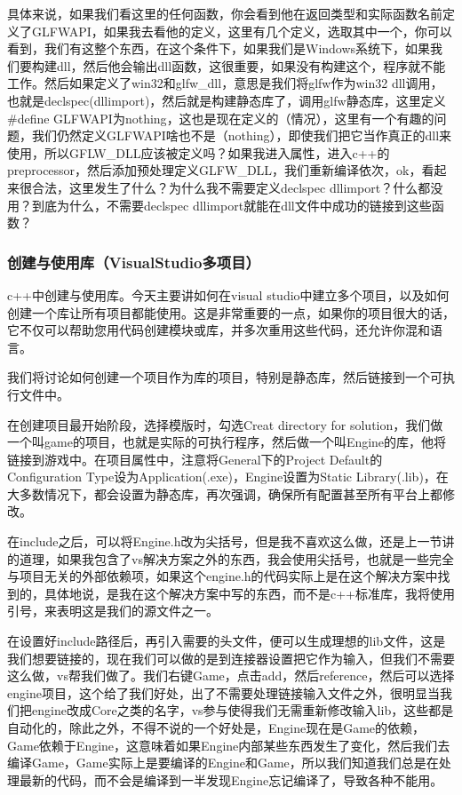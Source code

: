 具体来说，如果我们看这里的任何函数，你会看到他在返回类型和实际函数名前定义了{\ncodestyle GLFWAPI}，如果我去看他的定义，这里有几个定义，选取其中一个，你可以看到，我们有这整个东西，在这个条件下，如果我们是Windows系统下，如果我们要构建{\ncodestyle dll}，然后他会输出{\ncodestyle dll}函数，这很重要，如果没有构建这个，程序就不能工作。然后如果定义了{\ncodestyle win32}和{\ncodestyle glfw_dll}，意思是我们将{\ncodestyle glfw}作为{\ncodestyle win32 dll}调用，也就是declspec(dllimport)，然后就是构建静态库了，调用{\ncodestyle glfw}静态库，这里定义{\ncodestyle \#define GLFWAPI}为{\ncodestyle nothing}，这也是现在定义的（情况），这里有一个有趣的问题，我们仍然定义{\ncodestyle GLFWAPI}啥也不是（{\ncodestyle nothing}），即使我们把它当作真正的dll来使用，所以{\ncodestyle GFLW_DLL}应该被定义吗？如果我进入属性，进入c++的{\ncodestyle preprocessor}，然后添加预处理定义{\ncodestyle GLFW_DLL}，我们重新编译依次，ok，看起来很合法，这里发生了什么？为什么我不需要定义{\ncodestyle declspec dllimport}？什么都没用？到底为什么，不需要{\ncodestyle declspec dllimport}就能在{\ncodestyle dll}文件中成功的链接到这些函数？

\subsubsection{创建与使用库（VisualStudio多项目）}

c++中创建与使用库。今天主要讲如何在visual studio中建立多个项目，以及如何创建一个库让所有项目都能使用。这是非常重要的一点，如果你的项目很大的话，它不仅可以帮助您用代码创建模块或库，并多次重用这些代码，还允许你混和语言。

我们将讨论如何创建一个项目作为库的项目，特别是静态库，然后链接到一个可执行文件中。

在创建项目最开始阶段，选择模版时，勾选Creat directory for solution，我们做一个叫game的项目，也就是实际的可执行程序，然后做一个叫Engine的库，他将链接到游戏中。在项目属性中，注意将General下的Project Default的Configuration Type设为Application(.exe)，Engine设置为Static Library(.lib)，在大多数情况下，都会设置为静态库，再次强调，确保所有配置甚至所有平台上都修改。

在include之后，可以将Engine.h改为尖括号，但是我不喜欢这么做，还是上一节讲的道理，如果我包含了vs解决方案之外的东西，我会使用尖括号，也就是一些完全与项目无关的外部依赖项，如果这个engine.h的代码实际上是在这个解决方案中找到的，具体地说，是我在这个解决方案中写的东西，而不是c++标准库，我将使用引号，来表明这是我们的源文件之一。

在设置好include路径后，再引入需要的头文件，便可以生成理想的lib文件，这是我们想要链接的，现在我们可以做的是到连接器设置把它作为输入，但我们不需要这么做，vs帮我们做了。我们右键Game，点击add，然后reference，然后可以选择engine项目，这个给了我们好处，出了不需要处理链接输入文件之外，很明显当我们把engine改成Core之类的名字，vs参与使得我们无需重新修改输入lib，这些都是自动化的，除此之外，不得不说的一个好处是，Engine现在是Game的依赖，Game依赖于Engine，这意味着如果Engine内部某些东西发生了变化，然后我们去编译Game，Game实际上是要编译的Engine和Game，所以我们知道我们总是在处理最新的代码，而不会是编译到一半发现Engine忘记编译了，导致各种不能用。

